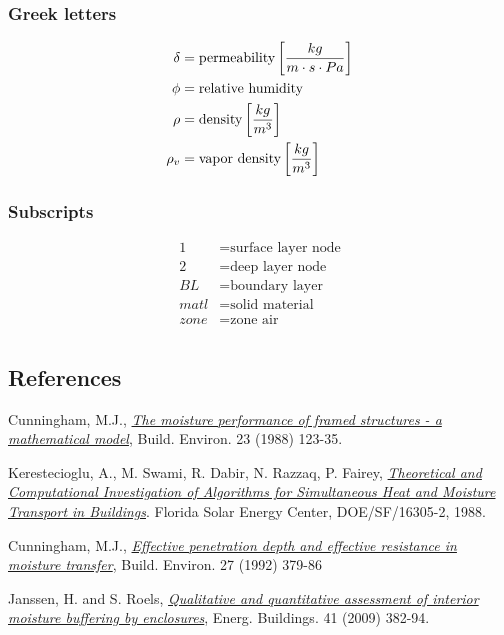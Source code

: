 \subsubsection{Greek letters}\label{greek-letters}
\begin{align*}
  \delta  &= \text{permeability} \left[\frac{kg}{m \cdot s \cdot Pa}\right] \\
  \phi &= \text{relative humidity} \\
  \rho &= \text{density} \left[\frac{kg}{m^{3}}\right] \\
  \rho_{v} &= \text{vapor density} \left[\frac{kg}{m^{3}}\right] \\
\end{align*}

\subsubsection{Subscripts}\label{subscripts-and-superscripts}
\begin{align*}
	1 &= \text{surface layer node} \\
	2 &= \text{deep layer node} \\
	BL &= \text{boundary layer} \\
	matl &= \text{solid material} \\
	zone &= \text{zone air} \\
\end{align*}

\subsection{References}\label{references-019}

Cunningham, M.J.,
\href{http://www.sciencedirect.com/science/article/pii/0360132388900261}{\emph{The
		moisture performance of framed structures - a mathematical model}},
Build. Environ. 23 (1988) 123-35.

Kerestecioglu, A., M. Swami, R. Dabir, N. Razzaq, P. Fairey,
\href{http://www.fsec.ucf.edu/en/publications/pdf/FSEC-CR-191-88.pdf}{\emph{Theoretical
		and Computational Investigation of Algorithms for Simultaneous Heat and
		Moisture Transport in Buildings}}. Florida Solar Energy Center,
DOE/SF/16305-2, 1988.

Cunningham, M.J.,
\href{http://www.sciencedirect.com/science/article/pii/036013239290037P}{\emph{Effective
		penetration depth and effective resistance in moisture transfer}},
Build. Environ. 27 (1992) 379-86

Janssen, H. and S. Roels,
\href{http://www.sciencedirect.com/science/article/pii/S0378778808002387}{\emph{Qualitative
		and quantitative assessment of interior moisture buffering by
		enclosures}}, Energ. Buildings. 41 (2009) 382-94.

